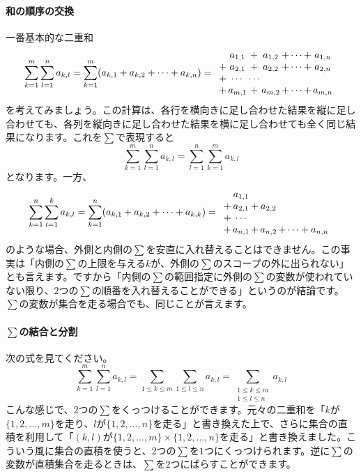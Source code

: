 \paragraph{和の順序の交換} 一番基本的な二重和
\begin{align*}
\sum_{k = 1}^m \sum_{l  = 1}^n a_{k, l} 
= \sum_{k = 1}^m (a_{k, 1} + a_{k, 2} + \cdots + a_{k, n} )
=
\begin{array}{c@{\,}c@{\,}c@{\,}c@{\,}c@{\,}c}
 &a_{1, 1}  &+ &a_{1, 2} &+ \cdots + &a_{1, n} \\
+ &a_{2, 1} &+ &a_{2, 2} &+ \cdots + &a_{2, n} \\
+ & \cdots &\cdots \\
+ &a_{m, 1} &+ &a_{m, 2} &+ \cdots + &a_{m, n}
\end{array}
\end{align*}
を考えてみましょう。この計算は、各行を横向きに足し合わせた結果を縦に足し合わせても、各列を縦向きに足し合わせた結果を横に足し合わせても全く同じ結果になります。これを$\sum$で表現すると
\[
\sum_{k = 1}^m \sum_{l  = 1}^n a_{k, l} =
\sum_{l  = 1}^n \sum_{k = 1}^m a_{k, l} 
\]
となります。一方、
\begin{align*}
\sum_{k = 1}^n \sum_{l  = 1}^k a_{k,l}
= \sum_{k = 1}^n (a_{k, 1} + a_{k, 2} + \cdots + a_{k, k})
=
\begin{array}{c@{\,}c@{\,}c@{\,}c@{\,}c}
 &a_{1, 1} \\
+ &a_{2, 1} &+& a_{2, 2} \\
+ &\cdots \\
+ &a_{n, 1} &+& a_{n, 2} &+ \cdots + a_{n, n}
\end{array}
\end{align*}
のような場合、外側と内側の$\sum$を安直に入れ替えることはできません。この事実は「内側の$\sum$の上限を与える$k$が、外側の$\sum$のスコープの外に出られない」とも言えます。ですから「内側の$\sum$の範囲指定に外側の$\sum$の変数が使われていない限り、$2$つの$\sum$の順番を入れ替えることができる」というのが結論です。$\sum$の変数が集合を走る場合でも、同じことが言えます。

\paragraph{$\sum$の結合と分割} 次の式を見てください。
\[
\sum_{k = 1}^m \sum_{l = 1}^n a_{k, l} = \sum_{1\leq k\leq m} \sum_{1\leq l\leq n} a_{k, l} = \sum_{\substack	{1\leq k \leq m\\ 1\leq l\leq n}} a_{k, l}
\]
こんな感じで、$2$つの$\sum$をくっつけることができます。元々の二重和を「$k$が$\{1,2,\ldots,m\}$を走り、$l$が$\{1,2,\ldots,n\}$を走る」と書き換えた上で、さらに集合の直積を利用して「$(k,l)$が$\{1,2,\ldots,m\}\times\{1,2,\ldots,n\}$を走る」と書き換えました。こういう風に集合の直積を使うと、$2$つの$\sum$を$1$つにくっつけられます。逆に$\sum$の変数が直積集合を走るときは、$\sum$を$2$つにばらすことができます。

